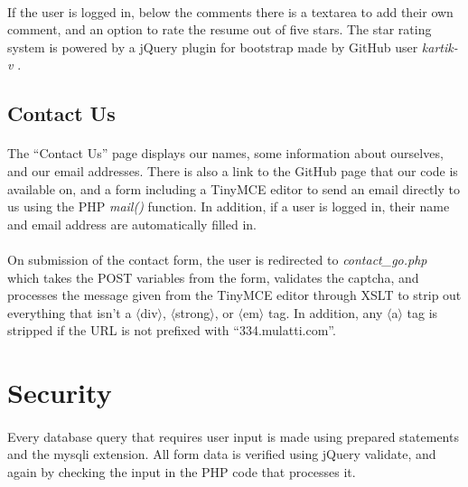 \documentclass[11pt,letterpaper,titlepage]{article}
\begin{document}
        \paragraph{}
        If the user is logged in, below the comments there is a textarea to add
        their own comment, and an option to rate the resume out of five stars.
        The star rating system is powered by a jQuery plugin for bootstrap made
        by GitHub user \emph{kartik-v} \cite{stars}.

        \subsection{Contact Us}
        \paragraph{}
        The ``Contact Us'' page displays our names, some information about
        ourselves, and our email addresses. There is also a link to the GitHub
        page that our code is available on, and a form including a TinyMCE
        \cite{tinymce} editor to send an email directly to us using the PHP
        \emph{mail()} function. In addition, if a user is logged in, their
        name and email address are automatically filled in.

        \paragraph{}
        On submission of the contact form, the user is redirected to
        \emph{contact\_go.php} which takes the POST variables from the form,
        validates the captcha, and processes the message given from the TinyMCE
        editor through XSLT to strip out everything that isn't a
        $\langle$div$\rangle$, $\langle$strong$\rangle$, or $\langle$em$\rangle$
        tag. In addition, any $\langle$a$\rangle$ tag is stripped if the
        URL is not prefixed with ``334.mulatti.com''.

    \section{Security}
    \paragraph{}
    Every database query that requires user input is made using prepared
    statements and the mysqli extension. All form data is verified using
    jQuery validate, and again by checking the input in the PHP code that
    processes it.
\end{document}
